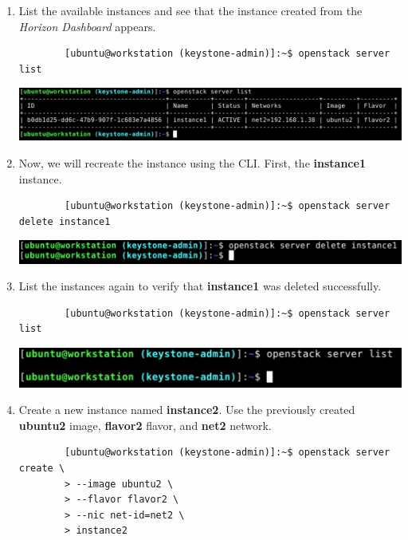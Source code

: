 \documentclass[letterpaper, 12pt]{article}
\begin{document}
\begin{enumerate}
    \item List the available instances and see that the instance created from the \textit{Horizon Dashboard} appears.
    \begin{lstlisting}
        [ubuntu@workstation (keystone-admin)]:~$ openstack server list
    \end{lstlisting}

    \begin{center}
        \includegraphics[width=\linewidth]{images/part4/step9.png}
    \end{center}

    \item Now, we will recreate the instance using the CLI. First, the \textbf{instance1} instance.
    \begin{lstlisting}
        [ubuntu@workstation (keystone-admin)]:~$ openstack server delete instance1
    \end{lstlisting}

    \begin{center}
        \includegraphics[width=\linewidth]{images/part4/step10.png}
    \end{center}

    \item List the instances again to verify that \textbf{instance1} was deleted successfully.
    \begin{lstlisting}
        [ubuntu@workstation (keystone-admin)]:~$ openstack server list
    \end{lstlisting}

    \begin{center}
        \includegraphics[width=\linewidth]{images/part4/step11.png}
    \end{center}

    \item Create a new instance named \textbf{instance2}. Use the previously created \textbf{ubuntu2} image,
    \textbf{flavor2} flavor, and \textbf{net2} network.
    \begin{lstlisting}
        [ubuntu@workstation (keystone-admin)]:~$ openstack server create \
        > --image ubuntu2 \
        > --flavor flavor2 \
        > --nic net-id=net2 \
        > instance2
    \end{lstlisting}


\end{enumerate}
\end{document}
